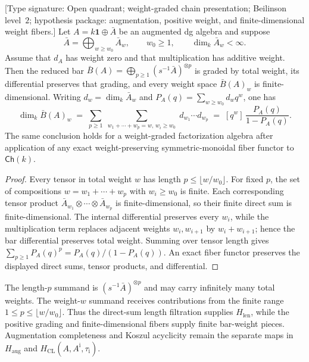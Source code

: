 \begin{lemma}
\label{lem:archetype-H123-witness}
%
\textup{[Type signature: Open quadrant; weight-graded chain
presentation; Beilinson level~$2$; hypothesis package: augmentation,
positive weight, and finite-dimensional weight fibers.]}
Let $A=k\mathbf 1\oplus\bar A$ be an augmented dg algebra and suppose
\[
 \bar A=\bigoplus_{w\geq w_0}\bar A_w,
 \qquad w_0\geq1,
 \qquad \dim_k\bar A_w<\infty.
\]
Assume that $d_A$ has weight zero and that multiplication has additive
weight.  Then the reduced bar
$\bar B(A)=\bigoplus_{p\geq1}(s^{-1}\bar A)^{\otimes p}$ is graded by
total weight, its differential preserves that grading, and every
weight space $\bar B(A)_w$ is finite-dimensional.  Writing
$d_w=\dim_k\bar A_w$ and $P_A(q)=\sum_{w\geq w_0}d_wq^w$, one has
\[
\dim_k \bar B(A)_w
 \;=\;
 \sum_{p\geq 1}\;
 \sum_{w_1+\cdots+w_p=w,\,w_i\geq w_0}\;
 d_{w_1}\cdots d_{w_p}
 \;=\; [q^w]\,\frac{P_A(q)}{1-P_A(q)}.
\]
The same conclusion holds for a weight-graded factorization algebra
after application of any exact weight-preserving symmetric-monoidal
fiber functor to $\mathsf{Ch}(k)$.
\end{lemma}

\begin{proof}
Every tensor in total weight $w$ has length
$p\leq\lfloor w/w_0\rfloor$.  For fixed $p$, the set of compositions
$w=w_1+\cdots+w_p$ with $w_i\geq w_0$ is finite.  Each corresponding
tensor product
$\bar A_{w_1}\otimes\cdots\otimes\bar A_{w_p}$ is finite-dimensional,
so their finite direct sum is finite-dimensional.  The internal
differential preserves every $w_i$, while the multiplication term
replaces adjacent weights $w_i,w_{i+1}$ by $w_i+w_{i+1}$; hence the bar
differential preserves total weight.  Summing over tensor length gives
$\sum_{p\geq1}P_A(q)^p=P_A(q)/(1-P_A(q))$.  An exact fiber functor
preserves the displayed direct sums, tensor products, and differential.
\end{proof}

\begin{remark}
\label{rem:H3-not-finite-bar-depth}
%
The length-$p$ summand is $(s^{-1}\bar A)^{\otimes p}$ and may carry
infinitely many total weights.  The weight-$w$ summand receives
contributions from the finite range
$1\leq p\leq\lfloor w/w_0\rfloor$.  Thus the direct-sum length
filtration supplies $H_{\mathrm{len}}$, while the positive grading and
finite-dimensional fibers supply finite bar-weight pieces.
Augmentation completeness and Koszul acyclicity remain the separate
maps in $H_{\mathrm{aug}}$ and
$H_{\mathrm{CL}}(A,A^{\mathrm i},\tau_{\mathrm i})$.
\end{remark}

